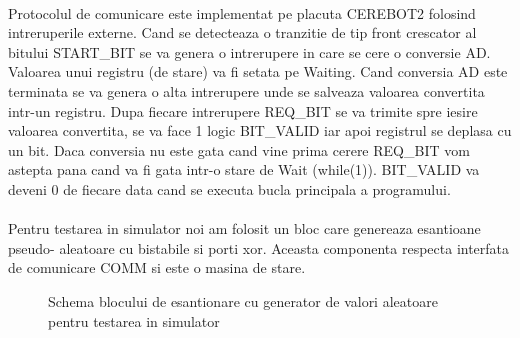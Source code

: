 \clearpage

\paragraph{}
Protocolul de comunicare este implementat pe placuta CEREBOT2 folosind intreruperile externe. Cand se detecteaza o tranzitie de tip front crescator al bitului START\_BIT se va genera o intrerupere in care se cere o conversie AD. Valoarea unui registru (de stare) va fi setata pe Waiting. Cand conversia AD este terminata se va genera o alta intrerupere unde se salveaza valoarea convertita intr-un registru. Dupa fiecare intrerupere REQ\_BIT  se va trimite spre iesire valoarea convertita, se va face 1 logic BIT\_VALID iar apoi  registrul se deplasa cu un bit. Daca conversia nu este gata cand vine prima cerere REQ\_BIT vom astepta pana cand va fi gata intr-o stare de Wait (while(1)). BIT\_VALID va deveni 0 de fiecare data cand se executa bucla principala a programului.




\paragraph{}
Pentru testarea in simulator noi am folosit un bloc care genereaza esantioane pseudo- aleatoare cu bistabile si porti xor. Aceasta componenta respecta interfata de comunicare COMM si este o masina de stare.


\begin{figure}[h]
\centering
\setlength\fboxsep{0pt}
\setlength\fboxrule{0.5pt}
\caption{Schema blocului de esantionare cu generator de valori aleatoare pentru testarea in simulator}
\label{fig:oscupdate-rand}
\end{figure}